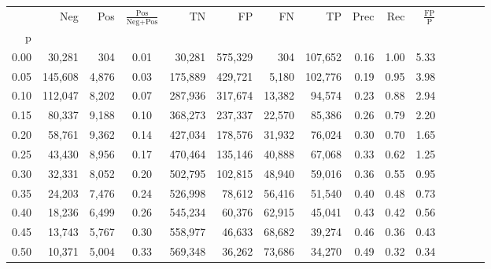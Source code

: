 \begin{tabular}{rrrcrrrrrrrrrrr}
\toprule
{} &      Neg &    Pos & $\frac{\text{Pos}}{\text{Neg}+\text{Pos}}$ &       TN &       FP &       FN &       TP &  Prec &   Rec & $\frac{\text{FP}}{\text{P}}$ \\
p    &          &        &                                            &          &          &          &          &       &       &                              \\
\midrule
0.00 &   30,281 &    304 &                                       0.01 &   30,281 &  575,329 &      304 &  107,652 &  0.16 &  1.00 &                         5.33 \\
0.05 &  145,608 &  4,876 &                                       0.03 &  175,889 &  429,721 &    5,180 &  102,776 &  0.19 &  0.95 &                         3.98 \\
0.10 &  112,047 &  8,202 &                                       0.07 &  287,936 &  317,674 &   13,382 &   94,574 &  0.23 &  0.88 &                         2.94 \\
0.15 &   80,337 &  9,188 &                                       0.10 &  368,273 &  237,337 &   22,570 &   85,386 &  0.26 &  0.79 &                         2.20 \\
0.20 &   58,761 &  9,362 &                                       0.14 &  427,034 &  178,576 &   31,932 &   76,024 &  0.30 &  0.70 &                         1.65 \\
0.25 &   43,430 &  8,956 &                                       0.17 &  470,464 &  135,146 &   40,888 &   67,068 &  0.33 &  0.62 &                         1.25 \\
0.30 &   32,331 &  8,052 &                                       0.20 &  502,795 &  102,815 &   48,940 &   59,016 &  0.36 &  0.55 &                         0.95 \\
0.35 &   24,203 &  7,476 &                                       0.24 &  526,998 &   78,612 &   56,416 &   51,540 &  0.40 &  0.48 &                         0.73 \\
0.40 &   18,236 &  6,499 &                                       0.26 &  545,234 &   60,376 &   62,915 &   45,041 &  0.43 &  0.42 &                         0.56 \\
0.45 &   13,743 &  5,767 &                                       0.30 &  558,977 &   46,633 &   68,682 &   39,274 &  0.46 &  0.36 &                         0.43 \\
0.50 &   10,371 &  5,004 &                                       0.33 &  569,348 &   36,262 &   73,686 &   34,270 &  0.49 &  0.32 &                         0.34 \\

\end{tabular}
